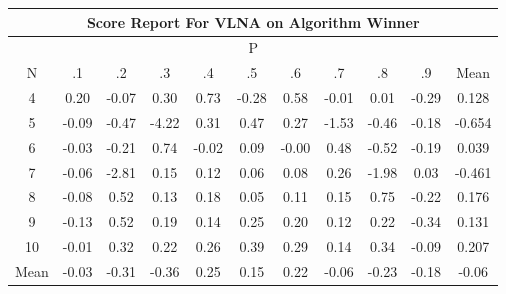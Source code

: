 \documentclass[11pt,a4paper]{report}
\begin{document}
\begin{longtable}{ | c || c | c | c | c | c | c | c | c | c || c |}
\hline
\multicolumn{11}{|c|}{ Score Report For VLNA on Algorithm Winner} \\
\hline
\multicolumn{11}{|c|}{ P } \\
\hline
N & .1 & .2 & .3 & .4 & .5 & .6 & .7 & .8 & .9 & Mean\\
 \hline
 \hline
 \endhead
  4 &  \cellcolor[HTML]{F7F7FF} 0.20 &  \cellcolor[HTML]{FFFFFF} -0.07 &  \cellcolor[HTML]{F7F7FF} 0.30 &  \cellcolor[HTML]{EFEFFF} 0.73 &  \cellcolor[HTML]{FFF7F7} -0.28 &  \cellcolor[HTML]{EFEFFF} 0.58 &  \cellcolor[HTML]{FFFFFF} -0.01 &  \cellcolor[HTML]{FFFFFF} 0.01 &  \cellcolor[HTML]{FFF7F7} -0.29 & 0.128 \\
  5 &  \cellcolor[HTML]{FFFFFF} -0.09 &  \cellcolor[HTML]{FFF7F7} -0.47 &  \cellcolor[HTML]{FF9797} -4.22 &  \cellcolor[HTML]{F7F7FF} 0.31 &  \cellcolor[HTML]{F7F7FF} 0.47 &  \cellcolor[HTML]{F7F7FF} 0.27 &  \cellcolor[HTML]{FFD7D7} -1.53 &  \cellcolor[HTML]{FFF7F7} -0.46 &  \cellcolor[HTML]{FFF7F7} -0.18 & -0.654 \\
  6 &  \cellcolor[HTML]{FFFFFF} -0.03 &  \cellcolor[HTML]{FFF7F7} -0.21 &  \cellcolor[HTML]{EFEFFF} 0.74 &  \cellcolor[HTML]{FFFFFF} -0.02 &  \cellcolor[HTML]{FFFFFF} 0.09 &  \cellcolor[HTML]{FFFFFF} -0.00 &  \cellcolor[HTML]{EFEFFF} 0.48 &  \cellcolor[HTML]{FFEFEF} -0.52 &  \cellcolor[HTML]{FFF7F7} -0.19 & 0.039 \\
  7 &  \cellcolor[HTML]{FFFFFF} -0.06 &  \cellcolor[HTML]{FFB7B7} -2.81 &  \cellcolor[HTML]{FFFFFF} 0.15 &  \cellcolor[HTML]{FFFFFF} 0.12 &  \cellcolor[HTML]{FFFFFF} 0.06 &  \cellcolor[HTML]{FFFFFF} 0.08 &  \cellcolor[HTML]{F7F7FF} 0.26 &  \cellcolor[HTML]{FFCFCF} -1.98 &  \cellcolor[HTML]{FFFFFF} 0.03 & -0.461 \\
  8 &  \cellcolor[HTML]{FFFFFF} -0.08 &  \cellcolor[HTML]{EFEFFF} 0.52 &  \cellcolor[HTML]{FFFFFF} 0.13 &  \cellcolor[HTML]{F7F7FF} 0.18 &  \cellcolor[HTML]{FFFFFF} 0.05 &  \cellcolor[HTML]{FFFFFF} 0.11 &  \cellcolor[HTML]{FFFFFF} 0.15 &  \cellcolor[HTML]{EFEFFF} 0.75 &  \cellcolor[HTML]{FFF7F7} -0.22 & 0.176 \\
  9 &  \cellcolor[HTML]{FFFFFF} -0.13 &  \cellcolor[HTML]{EFEFFF} 0.52 &  \cellcolor[HTML]{F7F7FF} 0.19 &  \cellcolor[HTML]{FFFFFF} 0.14 &  \cellcolor[HTML]{F7F7FF} 0.25 &  \cellcolor[HTML]{F7F7FF} 0.20 &  \cellcolor[HTML]{FFFFFF} 0.12 &  \cellcolor[HTML]{F7F7FF} 0.22 &  \cellcolor[HTML]{FFF7F7} -0.34 & 0.131 \\
  10 &  \cellcolor[HTML]{FFFFFF} -0.01 &  \cellcolor[HTML]{F7F7FF} 0.32 &  \cellcolor[HTML]{F7F7FF} 0.22 &  \cellcolor[HTML]{F7F7FF} 0.26 &  \cellcolor[HTML]{F7F7FF} 0.39 &  \cellcolor[HTML]{F7F7FF} 0.29 &  \cellcolor[HTML]{FFFFFF} 0.14 &  \cellcolor[HTML]{F7F7FF} 0.34 &  \cellcolor[HTML]{FFFFFF} -0.09 & 0.207 \\
 \hline
 \hline
Mean &  \cellcolor[HTML]{FFFFFF} -0.03 &  \cellcolor[HTML]{FFF7F7} -0.31 &  \cellcolor[HTML]{FFF7F7} -0.36 &  \cellcolor[HTML]{F7F7FF} 0.25 &  \cellcolor[HTML]{FFFFFF} 0.15 &  \cellcolor[HTML]{F7F7FF} 0.22 &  \cellcolor[HTML]{FFFFFF} -0.06 &  \cellcolor[HTML]{FFF7F7} -0.23 &  \cellcolor[HTML]{FFF7F7} -0.18 &  \cellcolor[HTML]{FFFFFF} -0.06
\end{longtable}
\end{document}
